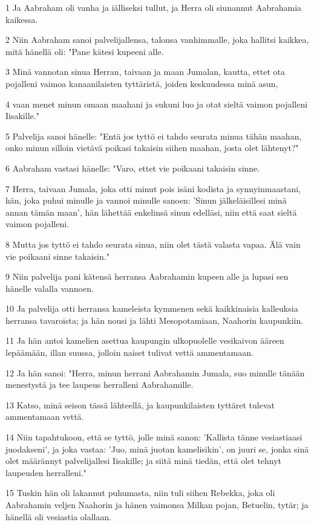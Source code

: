 \par 1 Ja Aabraham oli vanha ja iälliseksi tullut, ja Herra oli siunannut Aabrahamia kaikessa.
\par 2 Niin Aabraham sanoi palvelijallensa, talonsa vanhimmalle, joka hallitsi kaikkea, mitä hänellä oli: "Pane kätesi kupeeni alle.
\par 3 Minä vannotan sinua Herran, taivaan ja maan Jumalan, kautta, ettet ota pojalleni vaimoa kanaanilaisten tyttäristä, joiden keskuudessa minä asun,
\par 4 vaan menet minun omaan maahani ja sukuni luo ja otat sieltä vaimon pojalleni Iisakille."
\par 5 Palvelija sanoi hänelle: "Entä jos tyttö ei tahdo seurata minua tähän maahan, onko minun silloin vietävä poikasi takaisin siihen maahan, josta olet lähtenyt?"
\par 6 Aabraham vastasi hänelle: "Varo, ettet vie poikaani takaisin sinne.
\par 7 Herra, taivaan Jumala, joka otti minut pois isäni kodista ja synnyinmaastani, hän, joka puhui minulle ja vannoi minulle sanoen: 'Sinun jälkeläisillesi minä annan tämän maan', hän lähettää enkelinsä sinun edelläsi, niin että saat sieltä vaimon pojalleni.
\par 8 Mutta jos tyttö ei tahdo seurata sinua, niin olet tästä valasta vapaa. Älä vain vie poikaani sinne takaisin."
\par 9 Niin palvelija pani kätensä herransa Aabrahamin kupeen alle ja lupasi sen hänelle valalla vannoen.
\par 10 Ja palvelija otti herransa kameleista kymmenen sekä kaikkinaisia kalleuksia herransa tavaroista; ja hän nousi ja lähti Mesopotamiaan, Naahorin kaupunkiin.
\par 11 Ja hän antoi kamelien asettua kaupungin ulkopuolelle vesikaivon ääreen lepäämään, illan suussa, jolloin naiset tulivat vettä ammentamaan.
\par 12 Ja hän sanoi: "Herra, minun herrani Aabrahamin Jumala, suo minulle tänään menestystä ja tee laupeus herralleni Aabrahamille.
\par 13 Katso, minä seison tässä lähteellä, ja kaupunkilaisten tyttäret tulevat ammentamaan vettä.
\par 14 Niin tapahtukoon, että se tyttö, jolle minä sanon: 'Kallista tänne vesiastiaasi juodakseni', ja joka vastaa: 'Juo, minä juotan kamelisikin', on juuri se, jonka sinä olet määrännyt palvelijallesi Iisakille; ja siitä minä tiedän, että olet tehnyt laupeuden herralleni."
\par 15 Tuskin hän oli lakannut puhumasta, niin tuli siihen Rebekka, joka oli Aabrahamin veljen Naahorin ja hänen vaimonsa Milkan pojan, Betuelin, tytär; ja hänellä oli vesiastia olallaan.
